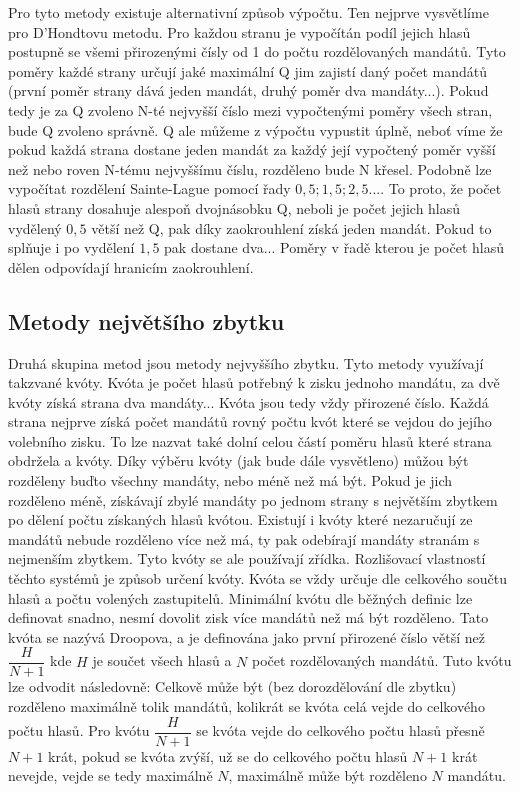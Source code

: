 \documentclass[12pt]{report}
\begin{document}
Pro tyto metody existuje alternativní způsob výpočtu.
Ten nejprve vysvětlíme pro D'Hondtovu metodu.
Pro každou stranu je vypočítán podíl jejich hlasů postupně se všemi přirozenými čísly od 1 do počtu rozdělovaných mandátů.
Tyto poměry každé strany určují jaké maximální Q jim zajistí daný počet mandátů (první poměr strany dává jeden mandát, druhý poměr dva mandáty...).
Pokud tedy je za Q zvoleno N-té nejvyšší číslo mezi vypočtenými poměry všech stran, bude Q zvoleno správně.
Q ale můžeme z výpočtu vypustit úplně, neboť víme že pokud každá strana dostane jeden mandát za každý její vypočtený poměr vyšší než nebo roven N-tému nejvyššímu číslu, rozděleno bude N křesel.
Podobně lze vypočítat rozdělení Sainte-Lague pomocí řady $0{,}5; 1{,}5; 2{,}5...$.
To proto, že počet hlasů strany dosahuje alespoň dvojnásobku Q, neboli je počet jejich hlasů vydělený $0{,}5$ větší než Q, pak díky zaokrouhlení získá jeden mandát.
Pokud to splňuje i po vydělení $1{,}5$ pak dostane dva...
Poměry v řadě kterou je počet hlasů dělen odpovídají hranicím zaokrouhlení.
\subsection{Metody největšího zbytku} 
Druhá skupina metod jsou metody nejvyššího zbytku.
Tyto metody využívají takzvané kvóty.
Kvóta je počet hlasů potřebný k zisku jednoho mandátu, za dvě kvóty získá strana dva mandáty...
Kvóta jsou tedy vždy přirozené číslo.
Každá strana nejprve získá počet mandátů rovný počtu kvót které se vejdou do jejího volebního zisku.
To lze nazvat také dolní celou částí poměru hlasů které strana obdržela a kvóty.
Díky výběru kvóty (jak bude dále vysvětleno) můžou být rozděleny buďto všechny mandáty, nebo méně než má být.
Pokud je jich rozděleno méně, získávají zbylé mandáty po jednom strany s největším zbytkem po dělení počtu získaných hlasů kvótou.
Existují i kvóty které nezaručují ze mandátů nebude rozděleno více než má, ty pak odebírají mandáty stranám s nejmenším zbytkem.
Tyto kvóty se ale používají zřídka.
Rozlišovací vlastností těchto systémů je způsob určení kvóty.
Kvóta se vždy určuje dle celkového součtu hlasů a počtu volených zastupitelů.
Minimální kvótu dle běžných definic lze definovat snadno, nesmí dovolit zisk více mandátů než má být rozděleno.
Tato kvóta se nazývá Droopova, a je definována jako první přirozené číslo větší než $\dfrac{H}{N+1}$ kde $H$ je součet všech hlasů a $N$ počet rozdělovaných mandátů.
Tuto kvótu lze odvodit následovně: Celkově může být (bez dorozdělování dle zbytku) rozděleno maximálně tolik mandátů, kolikrát se kvóta celá vejde do celkového počtu hlasů.
Pro kvótu $\dfrac{H}{N+1}$ se kvóta vejde do celkového počtu hlasů přesně $N+1$ krát, pokud se kvóta zvýší, už se do celkového počtu hlasů $N+1$ krát nevejde, vejde se tedy maximálně $N$, maximálně může být rozděleno $N$ mandátu.
\end{document}
